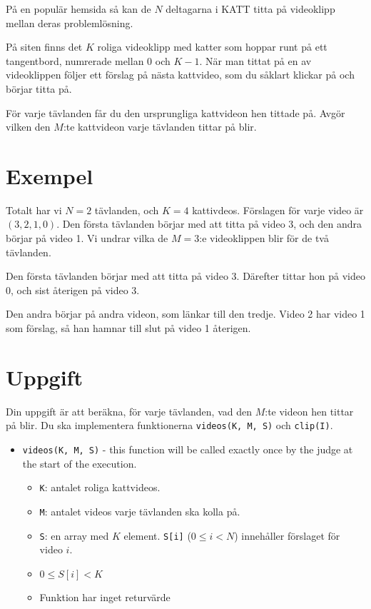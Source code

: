 \newcommand\version{v1}
På en populär hemsida så kan de $N$ deltagarna i KATT titta på videoklipp mellan deras problemlösning.

På siten finns det $K$ roliga videoklipp med katter som hoppar runt på ett tangentbord, numrerade mellan $0$ och $K - 1$.
När man tittat på en av videoklippen följer ett förslag på nästa kattvideo, som du såklart klickar på och börjar titta på.

För varje tävlanden får du den ursprungliga kattvideon hen tittade på. Avgör vilken den $M$:te kattvideon varje tävlanden tittar på blir.

\section*{Exempel}
Totalt har vi $N = 2$ tävlanden, och $K = 4$ kattivdeos.
Förslagen för varje video är $(3, 2, 1, 0)$. Den första tävlanden börjar med att titta på video 3, och den andra börjar på video 1.
Vi undrar vilka de $M = 3$:e videoklippen blir för de två tävlanden.

Den första tävlanden börjar med att titta på video 3. Därefter tittar hon på video 0, och sist återigen på video 3.

Den andra börjar på andra videon, som länkar till den tredje. Video 2 har video 1 som förslag, så han hamnar till slut på video 1 återigen.

\section*{Uppgift}
Din uppgift är att beräkna, för varje tävlanden, vad den $M$:te videon hen tittar på blir.
Du ska implementera funktionerna \texttt{videos(K, M, S)} och \texttt{clip(I)}.

\begin{itemize}
  \item \texttt{videos(K, M, S)} - this function will be called exactly once by the judge at the start of the execution.
  \begin{itemize}
    \item \texttt{K}: antalet roliga kattvideos.
    \item \texttt{M}: antalet videos varje tävlanden ska kolla på.
    \item \texttt{S}: en array med $K$ element. \texttt{S[i]} ($0 \le i < N$) innehåller förslaget för video $i$.
		\item $0 \le S[i] < K$
    \item Funktion har inget returvärde
  \end{itemize}
\end{itemize}


